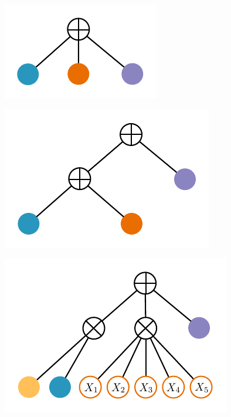 \documentclass[xcolor={usenames,dvipsnames,svgnames}, compress]{beamer}
\begin{document}
\begin{frame}
  \begin{minipage}[t]{1.70cm}
      \includegraphics[width=\linewidth]{figures/learnspn-1}
  \end{minipage}\hspace{3pt}\begin{minipage}[t]{2.35cm}
      \includegraphics[width=\linewidth]{figures/learnspn-4}
  \end{minipage}\hspace{3pt}\begin{minipage}[t]{2.43cm}
      \includegraphics[width=\linewidth]{figures/learnspn-3}                                             

\end{minipage}
\end{frame}
\end{document}
